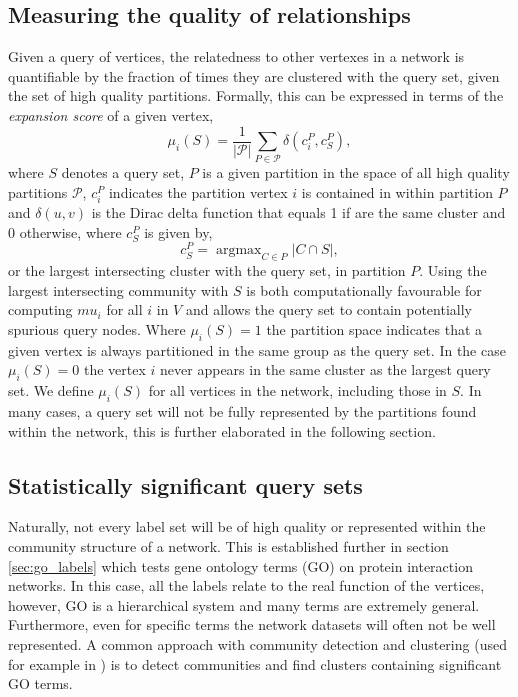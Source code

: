 \documentclass[manuscript, proceedings]{acmart}
\DeclareMathOperator*{\argmax}{argmax}
\begin{document}
\subsection{Measuring the quality of relationships} \label{sec:expansion}
Given a query of vertices, the relatedness to other vertexes in a network is quantifiable by the fraction of times they are clustered with the query set, given the set of high quality partitions.
Formally, this can be expressed in terms of the \textit{expansion score} of a given vertex,
\begin{equation} \label{eq:mu_score}
\mu_i(S) = \frac{1}{|\mathcal{P}|} \sum_{P \in \mathcal{P}} \delta(c^{P}_i, c^{P}_S),
\end{equation}
where $S$ denotes a query set, $P$ is a given partition in the space of all high quality partitions $\mathcal{P}$, $c^{P}_{i}$ indicates the partition vertex $i$ is contained in within partition $P$ and
$\delta(u, v)$ is the Dirac delta function that equals 1 if are the same cluster and $0$ otherwise, where $c^{P}_S$ is given by,
\begin{equation}
 c^{P}_S = \argmax_{C \in P} |C \cap S|,
\end{equation}
or the largest intersecting cluster with the query set, in partition $P$.
Using the largest intersecting community with $S$ is both computationally favourable for computing $mu_i$ for all $i$ in $V$ and allows the query set to contain potentially spurious query nodes.
Where $\mu_i(S) = 1$ the partition space indicates that a given vertex is always partitioned in the same group as the query set.
In the case $\mu_i(S) = 0$ the vertex $i$ never appears in the same cluster as the largest query set.
We define $\mu_i(S)$ for all vertices in the network, including those in $S$.
In many cases, a query set will not be fully represented by the partitions found within the network, this is further elaborated in the following section.

\subsection{Statistically significant query sets}
Naturally, not every label set will be of high quality or represented within the community structure of a network.
This is established further in section \ref{sec:go_labels} which tests gene ontology terms (GO) on protein interaction networks.
In this case, all the labels relate to the real function of the vertices, however, GO is a hierarchical system and many terms are extremely general.
Furthermore, even for specific terms the network datasets will often not be well represented.
A common approach with community detection and clustering (used for example in \cite{dekkers2013}) is to detect communities and find clusters containing significant GO terms.
\end{document}
